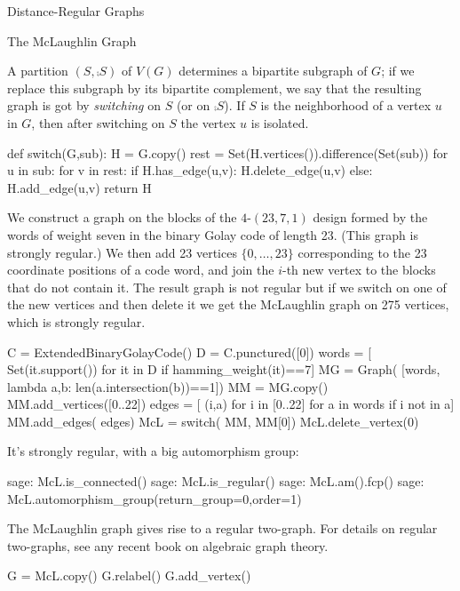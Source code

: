 \begin{chap}{Distance-Regular Graphs}
\begin{sect}{The McLaughlin Graph}
\begin{para}
A partition $(S,\comp{S})$ of $V(G)$ determines a bipartite subgraph of $G$;
if we replace this subgraph by its bipartite complement, we say that the
resulting graph is got by \textsl{switching} on $S$ (or on $\comp{S}$).
If $S$ is the neighborhood of a vertex $u$ in $G$, then after switching
on $S$ the vertex $u$ is isolated.
\end{para}
%
\begin{sageblock}
def switch(G,sub):
    H = G.copy()
    rest = Set(H.vertices()).difference(Set(sub))
    for u in sub:
        for v in rest:
            if H.has_edge(u,v): H.delete_edge(u,v)
            else: H.add_edge(u,v)
    return H   
\end{sageblock}
%
\begin{para}
We construct a graph on the blocks of the $4$-$(23,7,1)$ design
formed by the words of weight seven in the binary Golay code of length 23.
(This graph is strongly regular.)
We then add 23 vertices $\{0,\ldots,23\}$ corresponding to the 23 coordinate 
positions of a code word, and join the $i$-th new vertex to the blocks
that do not contain it. The result graph is not regular but if we switch on
one of the new vertices and then delete it we get the McLaughlin graph
on 275 vertices, which is strongly regular.
\end{para}
%
\begin{sageblock}
    C = ExtendedBinaryGolayCode()
    D = C.punctured([0])
    words = [ Set(it.support()) for it in D if hamming_weight(it)==7]
    MG = Graph( [words, lambda a,b: len(a.intersection(b))==1])
    MM = MG.copy()
    MM.add_vertices([0..22])
    edges = [ (i,a) for i in [0..22] for a in words if i not in a]
    MM.add_edges( edges)
    McL = switch( MM, MM[0])
    McL.delete_vertex(0)
\end{sageblock}
%
\begin{para}
It's strongly regular, with a big automorphism group:
\end{para}
%
\begin{sageexample}
sage: McL.is_connected()
sage: McL.is_regular()
sage: McL.am().fcp()
sage: McL.automorphism_group(return_group=0,order=1)
\end{sageexample}
%
\begin{para}
The McLaughlin graph gives rise to a regular two-graph. For details on regular
two-graphs, see any recent book on algebraic graph theory. 
\end{para}
%
\begin{sageblock}
    G = McL.copy()
    G.relabel()
    G.add_vertex()

\end{sageblock}
\end{sect}
\end{chap}
